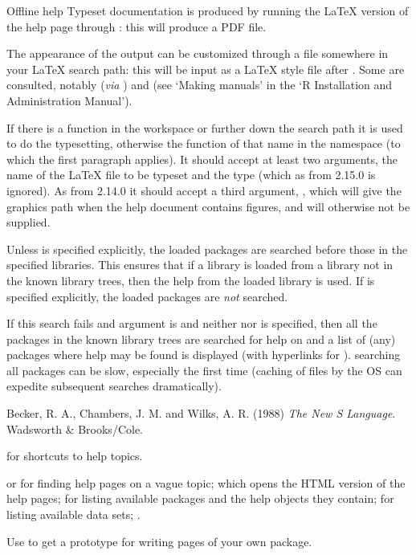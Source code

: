 %
\begin{Section}{Offline help}
Typeset documentation is produced by running the LaTeX version of the
help page through : this will produce a PDF file.

The appearance of the output can be customized through a file
 somewhere in your LaTeX search path: this will be
input as a LaTeX style file after .  Some
 are consulted, notably 
(\emph{via} ) and  (see
`Making manuals' in the `R Installation and
Administration Manual').

If there is a function  in the workspace or
further down the search path it is used to do the typesetting,
otherwise the function of that name in the  namespace (to
which the first paragraph applies).  It should accept at least two
arguments, the name of the LaTeX file to be typeset and the type
(which as from \R{} 2.15.0 is ignored).  As from \R{} 2.14.0 it should
accept a third argument, , which will give the
graphics path when the help document contains figures, and will
otherwise not be supplied.
\end{Section}
%
\begin{Note}\relax
Unless  is specified explicitly, the loaded packages are
searched before those in the specified libraries.  This ensures that
if a library is loaded from a library not in the known library trees,
then the help from the loaded library is used.  If  is
specified explicitly, the loaded packages are \emph{not} searched.

If this search fails and argument  is
 and neither  nor  is
specified, then all the packages in the known library trees are
searched for help on  and a list of (any) packages where
help may be found is displayed (with hyperlinks for ).   searching all packages can be slow, especially
the first time (caching of files by the OS can expedite subsequent
searches dramatically).
\end{Note}
%
\begin{References}\relax
Becker, R. A., Chambers, J. M. and Wilks, A. R. (1988)
\emph{The New S Language}.
Wadsworth \& Brooks/Cole.
\end{References}
%
\begin{SeeAlso}\relax
{} for shortcuts to help topics.

 or  for finding help pages
on a vague topic;
 which opens the HTML version of the \R{}
help pages;
 for listing available packages and the
help objects they contain;
 for listing available data sets;
.

Use  to get a prototype for writing 
pages of your own package.
\end{SeeAlso}
